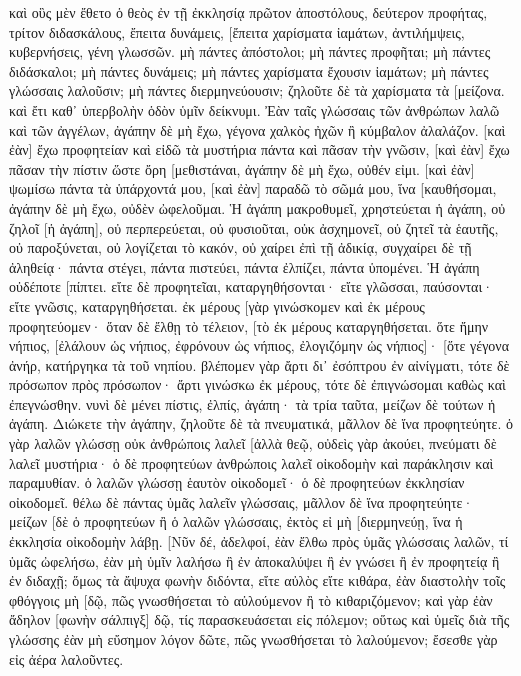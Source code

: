 καὶ οὓς μὲν ἔθετο ὁ θεὸς ἐν τῇ ἐκκλησίᾳ πρῶτον ἀποστόλους, δεύτερον προφήτας, τρίτον διδασκάλους, ἔπειτα δυνάμεις, [ἔπειτα χαρίσματα ἰαμάτων, ἀντιλήμψεις, κυβερνήσεις, γένη γλωσσῶν. 
μὴ πάντες ἀπόστολοι; μὴ πάντες προφῆται; μὴ πάντες διδάσκαλοι; μὴ πάντες δυνάμεις; 
μὴ πάντες χαρίσματα ἔχουσιν ἰαμάτων; μὴ πάντες γλώσσαις λαλοῦσιν; μὴ πάντες διερμηνεύουσιν; 
ζηλοῦτε δὲ τὰ χαρίσματα τὰ [μείζονα. καὶ ἔτι καθ᾽ ὑπερβολὴν ὁδὸν ὑμῖν δείκνυμι. 
Ἐὰν ταῖς γλώσσαις τῶν ἀνθρώπων λαλῶ καὶ τῶν ἀγγέλων, ἀγάπην δὲ μὴ ἔχω, γέγονα χαλκὸς ἠχῶν ἢ κύμβαλον ἀλαλάζον. 
[καὶ ἐὰν] ἔχω προφητείαν καὶ εἰδῶ τὰ μυστήρια πάντα καὶ πᾶσαν τὴν γνῶσιν, [καὶ ἐὰν] ἔχω πᾶσαν τὴν πίστιν ὥστε ὄρη [μεθιστάναι, ἀγάπην δὲ μὴ ἔχω, οὐθέν εἰμι. 
[καὶ ἐὰν] ψωμίσω πάντα τὰ ὑπάρχοντά μου, [καὶ ἐὰν] παραδῶ τὸ σῶμά μου, ἵνα [καυθήσομαι, ἀγάπην δὲ μὴ ἔχω, οὐδὲν ὠφελοῦμαι. 
Ἡ ἀγάπη μακροθυμεῖ, χρηστεύεται ἡ ἀγάπη, οὐ ζηλοῖ [ἡ ἀγάπη], οὐ περπερεύεται, οὐ φυσιοῦται, 
οὐκ ἀσχημονεῖ, οὐ ζητεῖ τὰ ἑαυτῆς, οὐ παροξύνεται, οὐ λογίζεται τὸ κακόν, 
οὐ χαίρει ἐπὶ τῇ ἀδικίᾳ, συγχαίρει δὲ τῇ ἀληθείᾳ· 
πάντα στέγει, πάντα πιστεύει, πάντα ἐλπίζει, πάντα ὑπομένει. 
Ἡ ἀγάπη οὐδέποτε [πίπτει. εἴτε δὲ προφητεῖαι, καταργηθήσονται· εἴτε γλῶσσαι, παύσονται· εἴτε γνῶσις, καταργηθήσεται. 
ἐκ μέρους [γὰρ γινώσκομεν καὶ ἐκ μέρους προφητεύομεν· 
ὅταν δὲ ἔλθῃ τὸ τέλειον, [τὸ ἐκ μέρους καταργηθήσεται. 
ὅτε ἤμην νήπιος, [ἐλάλουν ὡς νήπιος, ἐφρόνουν ὡς νήπιος, ἐλογιζόμην ὡς νήπιος]· [ὅτε γέγονα ἀνήρ, κατήργηκα τὰ τοῦ νηπίου. 
βλέπομεν γὰρ ἄρτι δι᾽ ἐσόπτρου ἐν αἰνίγματι, τότε δὲ πρόσωπον πρὸς πρόσωπον· ἄρτι γινώσκω ἐκ μέρους, τότε δὲ ἐπιγνώσομαι καθὼς καὶ ἐπεγνώσθην. 
νυνὶ δὲ μένει πίστις, ἐλπίς, ἀγάπη· τὰ τρία ταῦτα, μείζων δὲ τούτων ἡ ἀγάπη. 
Διώκετε τὴν ἀγάπην, ζηλοῦτε δὲ τὰ πνευματικά, μᾶλλον δὲ ἵνα προφητεύητε. 
ὁ γὰρ λαλῶν γλώσσῃ οὐκ ἀνθρώποις λαλεῖ [ἀλλὰ θεῷ, οὐδεὶς γὰρ ἀκούει, πνεύματι δὲ λαλεῖ μυστήρια· 
ὁ δὲ προφητεύων ἀνθρώποις λαλεῖ οἰκοδομὴν καὶ παράκλησιν καὶ παραμυθίαν. 
ὁ λαλῶν γλώσσῃ ἑαυτὸν οἰκοδομεῖ· ὁ δὲ προφητεύων ἐκκλησίαν οἰκοδομεῖ. 
θέλω δὲ πάντας ὑμᾶς λαλεῖν γλώσσαις, μᾶλλον δὲ ἵνα προφητεύητε· μείζων [δὲ ὁ προφητεύων ἢ ὁ λαλῶν γλώσσαις, ἐκτὸς εἰ μὴ [διερμηνεύῃ, ἵνα ἡ ἐκκλησία οἰκοδομὴν λάβῃ. 
[Νῦν δέ, ἀδελφοί, ἐὰν ἔλθω πρὸς ὑμᾶς γλώσσαις λαλῶν, τί ὑμᾶς ὠφελήσω, ἐὰν μὴ ὑμῖν λαλήσω ἢ ἐν ἀποκαλύψει ἢ ἐν γνώσει ἢ ἐν προφητείᾳ ἢ ἐν διδαχῇ; 
ὅμως τὰ ἄψυχα φωνὴν διδόντα, εἴτε αὐλὸς εἴτε κιθάρα, ἐὰν διαστολὴν τοῖς φθόγγοις μὴ [δῷ, πῶς γνωσθήσεται τὸ αὐλούμενον ἢ τὸ κιθαριζόμενον; 
καὶ γὰρ ἐὰν ἄδηλον [φωνὴν σάλπιγξ] δῷ, τίς παρασκευάσεται εἰς πόλεμον; 
οὕτως καὶ ὑμεῖς διὰ τῆς γλώσσης ἐὰν μὴ εὔσημον λόγον δῶτε, πῶς γνωσθήσεται τὸ λαλούμενον; ἔσεσθε γὰρ εἰς ἀέρα λαλοῦντες. 
